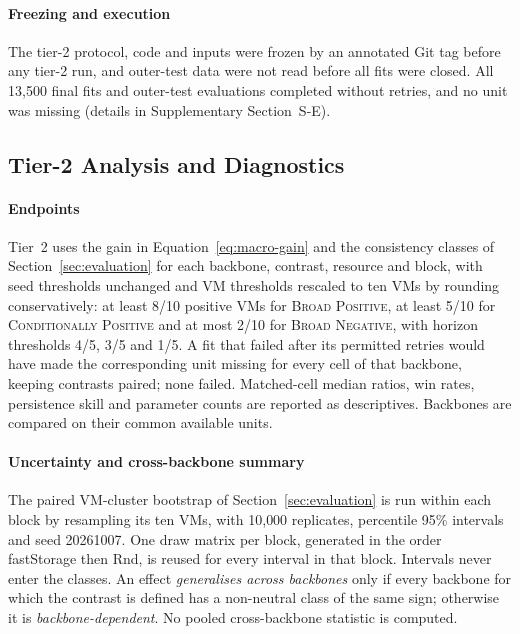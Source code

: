 \documentclass[5p,twocolumn]{elsarticle}
\begin{document}
\paragraph{Freezing and execution} The tier-2 protocol, code and inputs
were frozen by an annotated Git tag before any tier-2 run, and outer-test
data were not read before all fits were closed. All 13{,}500 final fits and
outer-test evaluations completed without retries, and no unit was missing
(details in Supplementary Section~S-E).

\subsection{Tier-2 Analysis and Diagnostics}
\label{sec:tier2-analysis}

\paragraph{Endpoints} Tier~2 uses the gain in
Equation~\ref{eq:macro-gain} and the consistency classes of
Section~\ref{sec:evaluation} for each backbone, contrast, resource and
block, with seed thresholds unchanged and VM thresholds rescaled to ten VMs
by rounding conservatively: at least 8/10 positive VMs for
\textsc{Broad Positive}, at least 5/10 for \textsc{Conditionally Positive}
and at most 2/10 for \textsc{Broad Negative}, with horizon thresholds 4/5,
3/5 and 1/5. A fit that failed after its permitted retries would have made
the corresponding unit missing for every cell of that backbone, keeping
contrasts paired; none failed. Matched-cell median ratios, win rates,
persistence skill and parameter counts are reported as descriptives.
Backbones are compared on their common available units.

\paragraph{Uncertainty and cross-backbone summary} The paired VM-cluster
bootstrap of Section~\ref{sec:evaluation} is run within each block by
resampling its ten VMs, with 10{,}000 replicates, percentile 95\% intervals
and seed 20261007. One draw matrix per block, generated in the order
fastStorage then Rnd, is reused for every interval in that block. Intervals
never enter the classes. An effect \emph{generalises across backbones} only
if every backbone for which the contrast is defined has a non-neutral class
of the same sign; otherwise it is \emph{backbone-dependent}. No pooled
cross-backbone statistic is computed.
\end{document}
